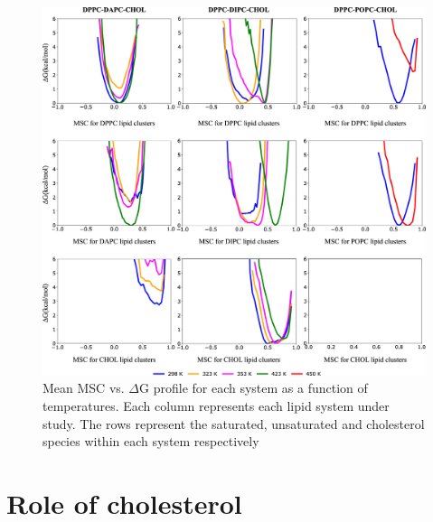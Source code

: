 \documentclass[10pt]{article}
\let\oldsection\section
\renewcommand{\section}{\clearpage\oldsection}
\begin{document}
\begin{figure}[H]
    \centering
    \includegraphics[width=6.5in]{Figures/Supplementary/AVs/MSC/placeholder.jpg}
    \caption{Mean MSC vs. $\Delta$G profile for each system as a function of temperatures. Each column represents each lipid system under study. The rows represent the saturated, unsaturated and cholesterol species within each system respectively}
    \label{figs5:view}
\end{figure}

\section{Role of cholesterol}
\end{document}
